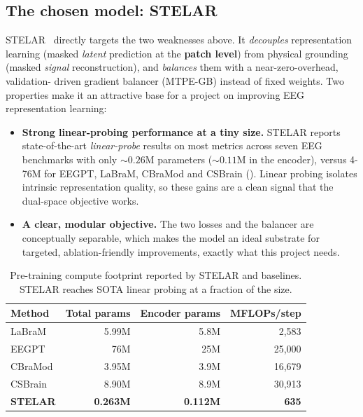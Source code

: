 \documentclass[11pt]{article}
\begin{document}
\subsection{The chosen model: STELAR}
STELAR~\cite{stelar2026,stelarfull} directly targets the two weaknesses above.
It \emph{decouples} representation learning (masked \emph{latent} prediction at the
\textbf{patch level}) from physical grounding (masked \emph{signal}
reconstruction), and \emph{balances} them with a near-zero-overhead, validation-
driven gradient balancer (MTPE-GB) instead of fixed weights. Two properties make
it an attractive base for a project on improving EEG representation learning:

\begin{itemize}
  \item \textbf{Strong linear-probing performance at a tiny size.} STELAR reports
  state-of-the-art \emph{linear-probe} results on most metrics across seven EEG
  benchmarks with only \(\sim\!0.26\)M parameters (\(\sim\!0.11\)M in the encoder),
  versus 4-76M for EEGPT, LaBraM, CBraMod and CSBrain ().
  Linear probing isolates intrinsic representation quality, so these gains are a
  clean signal that the dual-space objective works.
  \item \textbf{A clear, modular objective.} The two losses and the balancer are
  conceptually separable, which makes the model an ideal substrate for targeted,
  ablation-friendly improvements, exactly what this project needs.
\end{itemize}

\begin{table}[t]
\centering
\caption{Pre-training compute footprint reported by STELAR and baselines.
STELAR reaches SOTA linear probing at a fraction of the size.}
\label{tab:efficiency}
\small
\begin{tabular}{lrrr}
\toprule
Method & Total params & Encoder params & MFLOPs/step \\
\midrule
LaBraM   & 5.99M & 5.8M  & 2{,}583 \\
EEGPT    & 76M   & 25M   & 25{,}000 \\
CBraMod  & 3.95M & 3.9M  & 16{,}679 \\
CSBrain  & 8.90M & 8.9M  & 30{,}913 \\
\textbf{STELAR} & \textbf{0.263M} & \textbf{0.112M} & \textbf{635} \\
\bottomrule
\end{tabular}
\end{table}
\end{document}
